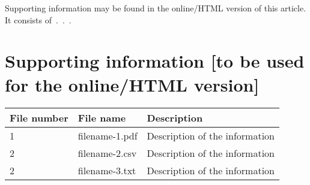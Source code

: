 \documentclass[letterpaper,12pt, twoside]{article}
\begin{document}
Supporting information may be found in the online/HTML version of this article. It consists of~.~.~.

\section*{Supporting information [to be used for the online/HTML version]}

\begin{tabular}{l l p{4in}}
\hline
File number & File name & Description\\
\hline
1 & filename-1.pdf	& Description of the information\\
2 & filename-2.csv	& Description of the information\\
2 & filename-3.txt	& Description of the information\\
\hline
\end{tabular}

\end{document}
